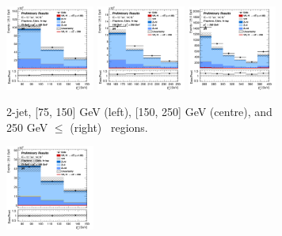 \begin{figure}[h!]
    \centering
    \begin{subfigure}[b]{\textwidth}
        \centering
        \includegraphics[width=0.32\textwidth]{Images/VH/Own_fit/prefit_VHcc/Region_distpTV_BMax150_BMin75_DSR_J2_TTypeln_T1_L2_Y6051_Prefit.png}
        \includegraphics[width=0.32\textwidth]{Images/VH/Own_fit/prefit_VHcc/Region_distpTV_BMax250_BMin150_DSR_J2_TTypeln_T1_L2_Y6051_Prefit.png}
        \includegraphics[width=0.32\textwidth]{Images/VH/Own_fit/prefit_VHcc/Region_distpTV_BMin250_DSR_J2_TTypeln_T1_L2_Y6051_Prefit.png}
        \caption{2-jet, [75, 150] GeV (left), [150, 250] GeV (centre), and 250  GeV $\leq$ (right) \ptv\ regions.}
        \label{fig:plots_VHcc_2L_LN_2J}
    \end{subfigure}
    \begin{subfigure}[b]{\textwidth}
        \centering
        \includegraphics[width=0.32\textwidth]{Images/VH/Own_fit/prefit_VHcc/Region_distpTV_BMax150_BMin75_DSR_J3_TTypeln_incJet1_T1_L2_Y6051_Prefit.png}

\end{subfigure}
\end{figure}
